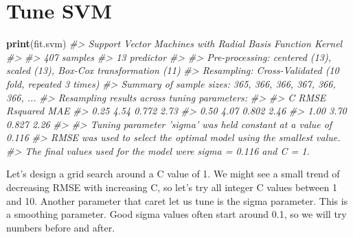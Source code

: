 \documentclass[]{book}
\newenvironment{Shaded}{\begin{snugshade}}{\end{snugshade}}
\newcommand{\CommentTok}[1]{\textcolor[rgb]{0.56,0.35,0.01}{\textit{#1}}}
\newcommand{\KeywordTok}[1]{\textcolor[rgb]{0.13,0.29,0.53}{\textbf{#1}}}
\newcommand{\NormalTok}[1]{#1}
\begin{document}
\hypertarget{tune-svm}{%
\section{Tune SVM}\label{tune-svm}}

\begin{Shaded}
\begin{Highlighting}[]
\KeywordTok{print}\NormalTok{(fit.svm)}
\CommentTok{#> Support Vector Machines with Radial Basis Function Kernel }
\CommentTok{#> }
\CommentTok{#> 407 samples}
\CommentTok{#>  13 predictor}
\CommentTok{#> }
\CommentTok{#> Pre-processing: centered (13), scaled (13), Box-Cox transformation (11) }
\CommentTok{#> Resampling: Cross-Validated (10 fold, repeated 3 times) }
\CommentTok{#> Summary of sample sizes: 365, 366, 366, 367, 366, 366, ... }
\CommentTok{#> Resampling results across tuning parameters:}
\CommentTok{#> }
\CommentTok{#>   C     RMSE  Rsquared  MAE }
\CommentTok{#>   0.25  4.54  0.772     2.73}
\CommentTok{#>   0.50  4.07  0.802     2.46}
\CommentTok{#>   1.00  3.70  0.827     2.26}
\CommentTok{#> }
\CommentTok{#> Tuning parameter 'sigma' was held constant at a value of 0.116}
\CommentTok{#> RMSE was used to select the optimal model using the smallest value.}
\CommentTok{#> The final values used for the model were sigma = 0.116 and C = 1.}
\end{Highlighting}
\end{Shaded}

Let's design a grid search around a C value of 1. We might see a small trend of decreasing RMSE with increasing C, so let's try all integer C values between 1 and 10. Another parameter that caret let us tune is the sigma parameter. This is a smoothing parameter. Good sigma values often start around 0.1, so we will try numbers before and after.
\end{document}

